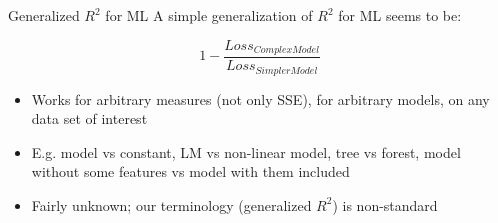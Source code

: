 \documentclass[11pt,compress,t,notes=noshow, xcolor=table]{beamer}
\begin{document}
\begin{vbframe}{Generalized $R^2$ for ML}
A simple generalization of $R^2$ for ML seems to be:

\[
1 - \frac{Loss_{ComplexModel}}{Loss_{SimplerModel}}
\]

\begin{itemize}
\item Works for arbitrary measures (not only SSE), for arbitrary models, on any data set of interest
\item E.g. model vs constant, LM vs non-linear model, tree vs forest, model without some features vs model with them included
\item Fairly unknown; our terminology (generalized $R^2$) is non-standard
\end{itemize}
\end{vbframe}


\endlecture
\end{document}
